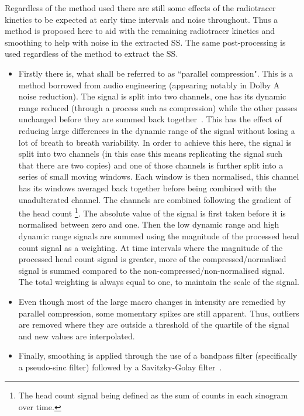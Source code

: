                 Regardless of the method used there are still some effects of the radiotracer kinetics to be expected at early time intervals and noise throughout. Thus a method is proposed here to aid with the remaining radiotracer kinetics and smoothing to help with noise in the extracted \gls{SS}. The same post-processing is used regardless of the method to extract the \gls{SS}.
                    
                \begin{itemize}
                    \item Firstly there is, what shall be referred to as ``parallel compression". This is a method borrowed from audio engineering (appearing notably in Dolby A noise reduction). The signal is split into two channels, one has its dynamic range reduced (through a process such as compression) while the other passes unchanged before they are summed back together~\parencite{Izhaki2012MixingTools}. This has the effect of reducing large differences in the dynamic range of the signal without losing a lot of breath to breath variability. In order to achieve this here, the signal is split into two channels (in this case this means replicating the signal such that there are two copies) and one of those channels is further split into a series of small moving windows. Each window is then normalised, this channel has its windows averaged back together before being combined with the unadulterated channel. The channels are combined following the gradient of the head count \footnote{The head count signal being defined as the sum of counts in each sinogram over time.}. The absolute value of the signal is first taken before it is normalised between zero and one. Then the low dynamic range and high dynamic range signals are summed using the magnitude of the processed head count signal as a weighting. At time intervals where the magnitude of the processed head count signal is greater, more of the compressed/normalised signal is summed compared to the non-compressed/non-normalised signal. The total weighting is always equal to one, to maintain the scale of the signal.
                        
                    \item Even though most of the large macro changes in intensity are remedied by parallel compression, some momentary spikes are still apparent. Thus, outliers are removed where they are outside a threshold of the quartile of the signal and new values are interpolated.
                        
                    \item Finally, smoothing is applied through the use of a bandpass filter (specifically a pseudo-sinc filter) followed by a Savitzky-Golay filter~\parencite{Savitzky1964SmoothingProcedures}.
                \end{itemize}

